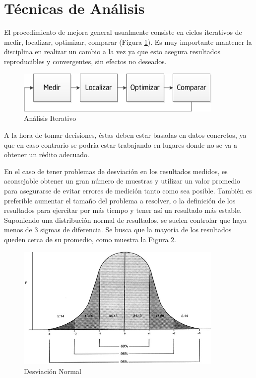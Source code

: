 \documentclass[a4paper]{report}
\begin{document}
\section{T\'ecnicas de An\'alisis}

El procedimiento de mejora general usualmente consiste en ciclos iterativos de medir, localizar, optimizar,
comparar (Figura \ref{fig:cycle}). Es muy importante mantener la disciplina en realizar un cambio a la
vez ya que esto asegura resultados reproducibles y convergentes, sin efectos no deseados.

\begin{figure}[H]
\begin{center}
\includegraphics[width=10cm]{cycle.png}
\caption{An\'alisis Iterativo}
\label{fig:cycle}
\end{center}
\end{figure}

A la hora de tomar decisiones, éstas deben estar basadas en datos concretos, ya que en caso contrario se podr\'ia estar trabajando en lugares donde no se va a obtener un r\'edito adecuado.

\bigskip

En el caso de tener problemas de desviaci\'on en los resultados medidos, es aconsejable obtener un gran n\'umero de muestras y utilizar un valor promedio para asegurarse de evitar errores de medici\'on tanto como sea posible. Tambi\'en es preferible aumentar el tama\~no del problema a resolver, o la definici\'on de los resultados para ejercitar por m\'as tiempo y tener as\'i un resultado m\'as estable.
Suponiendo una distribuci\'on normal de resultados, se suelen controlar que haya menos de 3 sigmas de diferencia. Se busca que la mayor\'ia de los resultados queden cerca de su promedio, como muestra la Figura \ref{fig:deviation}.

\begin{figure}[H]
\label{fig:deviation}
\begin{center}
\includegraphics[width=10cm]{deviation.png}
\caption{Desviaci\'on Normal}
\end{center}
\end{figure}
\end{document}
